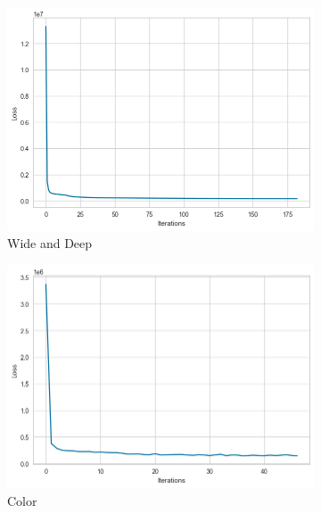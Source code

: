 \documentclass[11pt,letterpaper]{article}
\begin{document}
\begin{figure}[H]
    \centering
    \begin{subfigure}[b]{0.3\textwidth}
        \centering
        \includegraphics[width=\textwidth]{../Figures/mlp/mlp1.png}
        \caption{Wide and Deep}
        \label{fig:clarityBox}
    \end{subfigure}
    \hfill
    \begin{subfigure}[b]{0.3\textwidth}
        \centering
        \includegraphics[width=\textwidth]{../Figures/mlp/mlp2.png}        
        \caption{Color}
        \label{fig:colorBox}
    \end{subfigure}
    \hfill
    \begin{subfigure}[b]{0.3\textwidth}
        \centering

\end{subfigure}
\end{figure}
\end{document}
